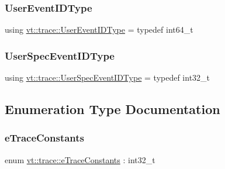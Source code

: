 \mbox{\label{namespacevt_1_1trace_a5908920d051c144c89f17c69ed262350}} 
\subsubsection{\texorpdfstring{User\+Event\+I\+D\+Type}{UserEventIDType}}
{\footnotesize\ttfamily using \hyperlink{namespacevt_1_1trace_a5908920d051c144c89f17c69ed262350}{vt\+::trace\+::\+User\+Event\+I\+D\+Type} = typedef int64\+\_\+t}

\mbox{\label{namespacevt_1_1trace_a70c43e0e1596eea236912d4197d3120a}} 
\subsubsection{\texorpdfstring{User\+Spec\+Event\+I\+D\+Type}{UserSpecEventIDType}}
{\footnotesize\ttfamily using \hyperlink{namespacevt_1_1trace_a70c43e0e1596eea236912d4197d3120a}{vt\+::trace\+::\+User\+Spec\+Event\+I\+D\+Type} = typedef int32\+\_\+t}



\subsection{Enumeration Type Documentation}
\mbox{\label{namespacevt_1_1trace_acf454dfbd581b0ebae895f90b5927a1d}} 
\subsubsection{\texorpdfstring{e\+Trace\+Constants}{eTraceConstants}}
{\footnotesize\ttfamily enum \hyperlink{namespacevt_1_1trace_acf454dfbd581b0ebae895f90b5927a1d}{vt\+::trace\+::e\+Trace\+Constants} \+: int32\+\_\+t\hspace{0.3cm}{\ttfamily [strong]}}

